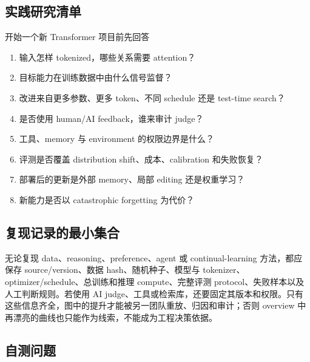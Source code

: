 \documentclass[a4paper]{article}
\begin{document}
\subsection{实践研究清单}

\begin{importantbox}{开始一个新 Transformer 项目前先回答}
\begin{enumerate}
  \item 输入怎样 tokenized，哪些关系需要 attention？
  \item 目标能力在训练数据中由什么信号监督？
  \item 改进来自更多参数、更多 token、不同 schedule 还是 test-time search？
  \item 是否使用 human/AI feedback，谁来审计 judge？
  \item 工具、memory 与 environment 的权限边界是什么？
  \item 评测是否覆盖 distribution shift、成本、calibration 和失败恢复？
  \item 部署后的更新是外部 memory、局部 editing 还是权重学习？
  \item 新能力是否以 catastrophic forgetting 为代价？
\end{enumerate}
\end{importantbox}

\subsection{复现记录的最小集合}

无论复现 data、reasoning、preference、agent 或 continual-learning 方法，都应保存 source/version、数据 hash、随机种子、模型与 tokenizer、optimizer/schedule、总训练和推理 compute、完整评测 protocol、失败样本以及人工判断规则。若使用 AI judge、工具或检索库，还要固定其版本和权限。只有这些信息齐全，图中的提升才能被另一团队重放、归因和审计；否则 overview 中再漂亮的曲线也只能作为线索，不能成为工程决策依据。

\subsection{自测问题}
\end{document}
